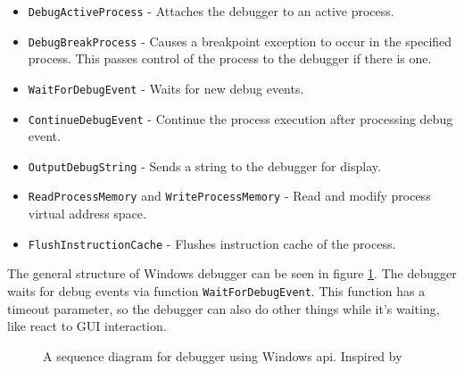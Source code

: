\begin{itemize}
    \item \texttt{DebugActiveProcess} - Attaches the debugger to an
        active process.
    \item \texttt{DebugBreakProcess} - Causes a breakpoint exception to
        occur in the specified process. This passes control of the process to
        the debugger if there is one.
    \item \texttt{WaitForDebugEvent} - Waits for new debug events.
    \item \texttt{ContinueDebugEvent} - Continue the process execution
        after processing debug event.
    \item \texttt{OutputDebugString} - Sends a string to the debugger
        for display.
    \item \texttt{ReadProcessMemory} and
        \texttt{WriteProcessMemory} - Read and modify
          process virtual address space.
    \item \texttt{FlushInstructionCache} - Flushes instruction cache of
        the process.
\end{itemize}

The general structure of Windows debugger can be seen in figure
\ref{fig:win32debugger}. The debugger waits for debug events via function
\texttt{WaitForDebugEvent}. This function has a timeout parameter, so
the debugger can also do other things while it's waiting, like react to GUI
interaction.
\begin{figure}
    \centering
    \caption{A sequence diagram for debugger using Windows api. Inspired by }
    \label{fig:win32debugger}
\end{figure}


